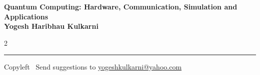 \documentclass[8pt,landscape]{article}
\begin{document}
\footnotesize

\begin{center}
\Large{\textbf{Quantum Computing: Hardware, Communication, Simulation and Applications\\ Yogesh Haribhau Kulkarni}}
\end{center}

\begin{multicols}{2}

\end{multicols}

\rule{\linewidth}{0.25pt}
\scriptsize
Copyleft \textcopyleft\  Send suggestions to
\href{http://www.yogeshkulkarni.com}{yogeshkulkarni@yahoo.com}
\end{document}
